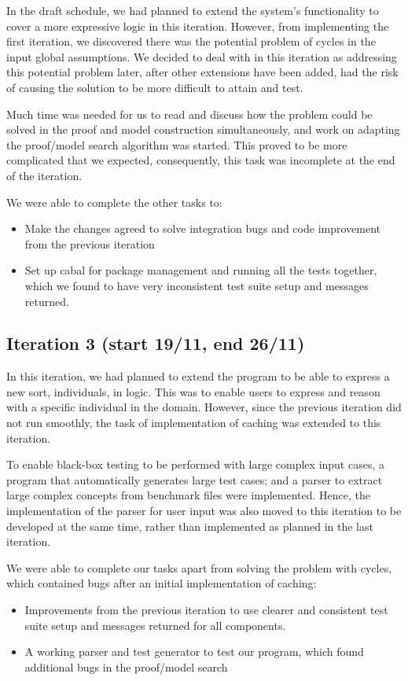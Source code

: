 In the draft schedule, we had planned to extend the system's functionality to cover a more expressive logic in this iteration. However, from implementing the first iteration, we discovered there was the potential problem of cycles in the input global assumptions. We decided to deal with in this iteration as addressing this potential problem later, after other extensions have been added, had the risk of causing the solution to be more difficult to attain and test. 

Much time was needed for us to read and discuss how the problem could be solved in the proof and model construction simultaneously, and work on adapting the proof/model search algorithm was started. This proved to be more complicated that we expected, consequently, this task was incomplete at the end of the iteration.

We were able to complete the other tasks to:
\begin{itemize}
\item Make the changes agreed to solve integration bugs and code improvement from the previous iteration
\item Set up cabal for package management and running all the tests together, which we found to have very inconsistent test suite setup and messages returned.
\end{itemize}

\subsection*{Iteration 3 (start 19/11, end 26/11)}

In this iteration, we had planned to extend the program to be able to express a new sort, individuals, in logic. This was to enable users to express and reason with a specific individual in the domain. However, since the previous iteration did not run smoothly, the task of implementation of caching was extended to this iteration.

To enable black-box testing to be performed with large complex input cases, a program that automatically generates large test cases; and a parser to extract large complex concepts from benchmark files were implemented. Hence, the implementation of the parser for user input was also moved to this iteration to be developed at the same time, rather than implemented as planned in the last iteration.

We were able to complete our tasks apart from solving the problem with cycles, which contained bugs after an initial implementation of caching:
\begin{itemize}
\item Improvements from the previous iteration to use clearer and consistent test suite setup and messages returned for all components.
\item A working parser and test generator to test our program, which found additional bugs in the proof/model search
\end{itemize}

